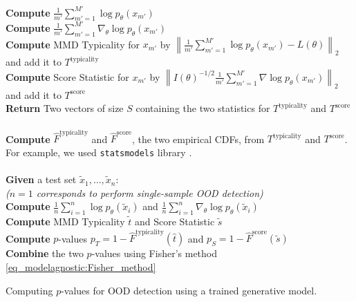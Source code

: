 {\begin{algorithm}[ht]
\begin{algorithmic}
\hspace{1.5em} \textbf{Compute} $\frac{1}{m'} \sum_{m'=1}^{M'}\log p_{\theta}({x}_{m'})$ \\
\hspace{1.5em} \textbf{Compute} $\frac{1}{m'} \sum_{m'=1}^{M'}\nabla_{{\theta}}\log p_{\theta}({x}_{m'})$ \\
\hspace{1.5em} \textbf{Compute} MMD Typicality for ${x}_{m'}$ by $\left\| \frac{1}{m'} \sum_{m'=1}^{M'}\log p_\theta ({x}_{m'}) - L(\theta) \right\|_2$ and add it to $T^{\text{typicality}}$\\
\hspace{1.5em} \textbf{Compute} Score Statistic for ${x}_{m'}$ by $\left\|{I(\theta)}^{-1/2} \frac{1}{m'} \sum_{m'=1}^{M'}\nabla \log p_\theta ({x}_{m'})\right\|_2$ and add it to $T^{\text{score}}$\\
\textbf{Return} Two vectors of size $S$ containing the two statistics for $T^{\text{typicality}}$ and $T^{\text{score}}$  \\
\textbf{} \\
\textbf{Compute} $\hat{F}^{\text{typicality}}$ and $\hat{F}^{\text{score}}$, the two empirical CDFs, from $T^{\text{typicality}}$ and $T^{\text{score}}$. For example, we used \texttt{statsmodels} library \citep{seabold_statsmodels_2010}. \\
\textbf{} \\  
\textbf{Given} a test set $\tilde{x}_1, \dots, \tilde{x}_n$:\\
\textit{($n=1$ corresponds to perform single-sample OOD detection)} \\ 
\hspace{1.5em} \textbf{Compute} $\frac{1}{n} \sum_{i=1}^{n}\log p_{\theta}(\tilde{{x}}_i)$ and $\frac{1}{n} \sum_{i=1}^{n}\nabla_{{\theta}}\log p_{\theta}(\tilde{{x}}_i)$ \\
\hspace{1.5em} \textbf{Compute} MMD Typicality $\tilde{t}$ and Score Statistic $\tilde{s}$ \\
\hspace{1.5em} \textbf{Compute} $p$-values $p_{T} = 1 - \hat{F}^{\text{typicality}}(\hat{t})$ and $p_{S} = 1 - \hat{F}^{\text{score}}(\tilde{s})$ \\
\hspace{1.5em} \textbf{Combine} the two $p$-values using Fisher's method \cref{eq_modelagnostic:Fisher_method}
\end{algorithmic}
\caption{Computing $p$-values for OOD detection using a trained generative model.}
\label{alg_modelagnostic:algo_description}
\end{algorithm}

}
